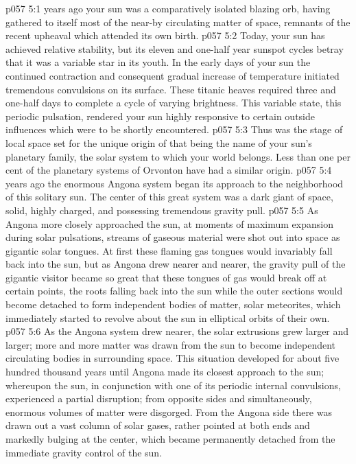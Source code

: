 \vs p057 5:1  years ago your sun was a comparatively isolated blazing orb, having gathered to itself most of the near\hyp{}by circulating matter of space, remnants of the recent upheaval which attended its own birth.
\vs p057 5:2 Today, your sun has achieved relative stability, but its eleven and one\hyp{}half year sunspot cycles betray that it was a variable star in its youth. In the early days of your sun the continued contraction and consequent gradual increase of temperature initiated tremendous convulsions on its surface. These titanic heaves required three and one\hyp{}half days to complete a cycle of varying brightness. This variable state, this periodic pulsation, rendered your sun highly responsive to certain outside influences which were to be shortly encountered.
\vs p057 5:3 Thus was the stage of local space set for the unique origin of  that being the name of your sun’s planetary family, the solar system to which your world belongs. Less than one per cent of the planetary systems of Orvonton have had a similar origin.
\pc \vs p057 5:4  years ago the enormous Angona system began its approach to the neighborhood of this solitary sun. The center of this great system was a dark giant of space, solid, highly charged, and possessing tremendous gravity pull.
\vs p057 5:5 As Angona more closely approached the sun, at moments of maximum expansion during solar pulsations, streams of gaseous material were shot out into space as gigantic solar tongues. At first these flaming gas tongues would invariably fall back into the sun, but as Angona drew nearer and nearer, the gravity pull of the gigantic visitor became so great that these tongues of gas would break off at certain points, the roots falling back into the sun while the outer sections would become detached to form independent bodies of matter, solar meteorites, which immediately started to revolve about the sun in elliptical orbits of their own.
\vs p057 5:6 As the Angona system drew nearer, the solar extrusions grew larger and larger; more and more matter was drawn from the sun to become independent circulating bodies in surrounding space. This situation developed for about five hundred thousand years until Angona made its closest approach to the sun; whereupon the sun, in conjunction with one of its periodic internal convulsions, experienced a partial disruption; from opposite sides and simultaneously, enormous volumes of matter were disgorged. From the Angona side there was drawn out a vast column of solar gases, rather pointed at both ends and markedly bulging at the center, which became permanently detached from the immediate gravity control of the sun.

